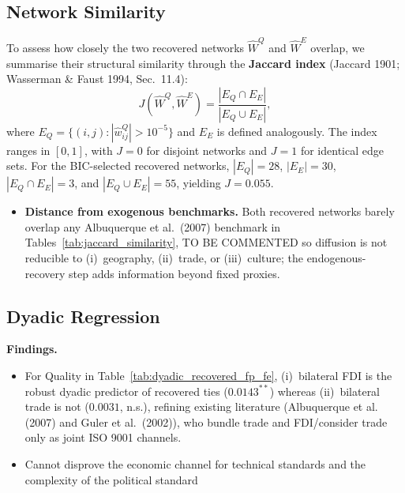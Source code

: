 \documentclass[12pt,a4paper]{article}
\begin{document}
\subsection{Network Similarity}
To assess how closely the two recovered networks $\hat W^Q$ and $\hat W^E$ overlap, we summarise their structural similarity through the \textbf{Jaccard index} (Jaccard 1901; Wasserman \& Faust 1994, Sec.\ 11.4): \begin{equation} J(\hat W^Q, \hat W^E) = \frac{|E_Q \cap E_E|}{|E_Q \cup E_E|}, \label{eq:jaccard} \end{equation} where $E_Q = \{(i, j) : |\hat w^Q_{ij}| > 10^{-5}\}$ and $E_E$ is defined analogously. The index ranges in $[0, 1]$, with $J = 0$ for disjoint networks and $J = 1$ for identical edge sets. For the BIC-selected recovered networks, $|E_Q| = 28$, $|E_E| = 30$, $|E_Q \cap E_E| = 3$, and $|E_Q \cup E_E| = 55$, yielding $J = 0.055$.
\begin{itemize}
    \item \textbf{Distance from exogenous benchmarks.} Both recovered networks barely overlap any Albuquerque et al.\ (2007) benchmark in Tables~\ref{tab:jaccard_similarity}, TO BE COMMENTED so diffusion is not reducible to (i)~geography, (ii)~trade, or (iii)~culture; the endogenous-recovery step adds information beyond fixed proxies.
\end{itemize}



\clearpage

\subsection{Dyadic Regression}




\textbf{Findings.}
\begin{itemize}
    \item For Quality in Table~\ref{tab:dyadic_recovered_fp_fe}, (i)~bilateral FDI is the robust dyadic predictor of recovered ties ($0.0143^{**}$) whereas (ii)~bilateral trade is not ($0.0031$, n.s.), refining existing literature (Albuquerque et al. (2007) and Guler et al.\ (2002)), who bundle trade and FDI/consider trade only as joint ISO 9001 channels.
    \item Cannot disprove the economic channel for technical standards and the complexity of the political standard
\end{itemize}
\end{document}
